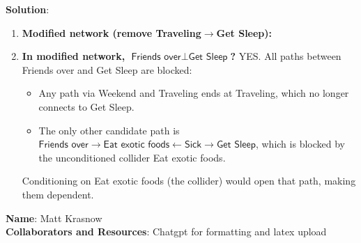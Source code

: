\documentclass[submit]{../harvardml}
\newcommand{\attr}[1]{\textsf{#1}}
\newenvironment{solution}{
    \vspace{2mm}
    \color{blue}\noindent\textbf{Solution}:
}{}
\begin{document}
\begin{solution}
\begin{enumerate}
\item \textbf{Modified network (remove \attr{Traveling}$\to$\attr{Get Sleep}):}
  \begin{center}
  \end{center}

\item \textbf{In modified network, $\attr{Friends over}\perp\attr{Get Sleep}$?}  
  YES.  All paths between \attr{Friends over} and \attr{Get Sleep} are blocked:
  \begin{itemize}
    \item Any path via \attr{Weekend} and \attr{Traveling} ends at \attr{Traveling}, which no longer connects to \attr{Get Sleep}.
    \item The only other candidate path is 
    \(\attr{Friends over}\to\attr{Eat exotic foods}\leftarrow\attr{Sick}\to\attr{Get Sleep}\),
    which is blocked by the unconditioned collider \attr{Eat exotic foods}.
  \end{itemize}
  Conditioning on \attr{Eat exotic foods} (the collider) would open that path, making them dependent.
\end{enumerate}
\end{solution}

\newpage

\textbf{Name}: Matt Krasnow\\
\textbf{Collaborators and Resources}: Chatgpt for formatting and latex upload
\end{document}
